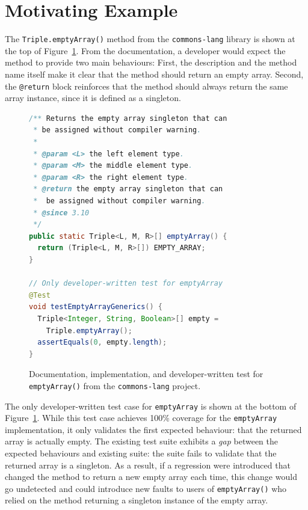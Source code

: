 \section{Motivating Example}
\label{sec:example}

The \texttt{Triple.emptyArray()} method from the \texttt{commons-lang} library is shown at the top of Figure~\ref{triple:emptyArray}. 
From the documentation, a developer would expect the method to provide two main behaviours: First, the description and the method name itself make it clear that the method should return an empty array. Second, the \texttt{@return} block reinforces that the method should always return the same array instance, since it is defined as a singleton.

\begin{figure}[h]
\begin{lstlisting}[language=Java]
/** Returns the empty array singleton that can   
 * be assigned without compiler warning.
 * 
 * @param <L> the left element type.
 * @param <M> the middle element type.
 * @param <R> the right element type.
 * @return the empty array singleton that can
 *  be assigned without compiler warning.
 * @since 3.10
 */
public static Triple<L, M, R>[] emptyArray() {
  return (Triple<L, M, R>[]) EMPTY_ARRAY;
}

// Only developer-written test for emptyArray
@Test
void testEmptyArrayGenerics() {
  Triple<Integer, String, Boolean>[] empty =
    Triple.emptyArray();
  assertEquals(0, empty.length);
}
\end{lstlisting}
\caption{Documentation, implementation, and developer-written test for \texttt{emptyArray()} from the \texttt{commons-lang} project.}
\label{triple:emptyArray}
\end{figure}

The only developer-written test case for \texttt{emptyArray} is shown at the bottom of Figure~\ref{triple:emptyArray}. While this test case achieves 100\% coverage for the \texttt{emptyArray} implementation, it only validates the first expected behaviour: that the returned array is actually empty.
The existing test suite exhibits a \emph{gap} between the expected behaviours and existing suite: the suite fails to validate that the returned array is a singleton. 
As a result, if a regression were introduced that changed the method to return a new empty array each time, this change would go undetected and could introduce new faults to users of \texttt{emptyArray()} who relied on the method returning a singleton instance of the empty array.

